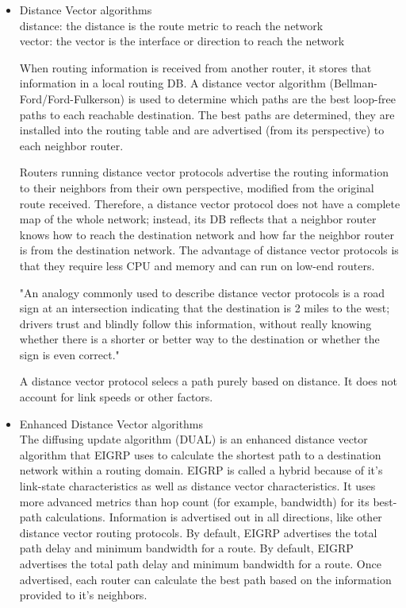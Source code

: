 \documentclass{article}
\begin{document}
\newpage
\begin{itemize}
\item Distance Vector algorithms\\

	distance: the distance is the route metric to reach the network\\
	vector: the vector is the interface or direction to reach the  network

	When routing information is received from another router, it stores that information in a local routing DB. A distance vector algorithm  (Bellman-Ford/Ford-Fulkerson) is used to determine which paths are the best loop-free paths to each reachable destination. The best paths are determined, they are installed into the routing table and are advertised (from its perspective) to each neighbor router.

	Routers running distance vector protocols advertise the routing information to their neighbors from their own perspective, modified from the original route received. Therefore, a distance vector protocol does not have a complete map of the whole network; instead, its DB reflects that a neighbor router knows how to reach the destination network and how far the neighbor router is from the destination network. The advantage of distance vector protocols is that they require less CPU and memory and can run on low-end routers.

"An analogy commonly used to describe distance vector protocols is a road sign at an intersection indicating that the destination is 2 miles to the west; drivers trust and blindly follow this information, without really knowing whether there is a shorter or better way to the destination or whether the sign is even correct."

	A distance vector protocol selecs a path purely based on distance. It does not account for link speeds or other factors.

\item Enhanced Distance Vector algorithms\\

	The diffusing update algorithm (DUAL) is an enhanced distance vector algorithm that EIGRP uses to calculate the shortest path to a destination network within a routing domain. EIGRP is called a hybrid because of it's link-state characteristics as well as distance vector characteristics. It uses more advanced metrics than hop count (for example, bandwidth) for its best-path calculations. Information is advertised out in all directions, like other distance vector routing protocols. By default, EIGRP advertises the total path delay and minimum bandwidth for a route. By default, EIGRP advertises the total path delay and minimum bandwidth for a route. Once advertised, each router can calculate the best path based on the information provided to it's neighbors.


\end{itemize}
\end{document}

